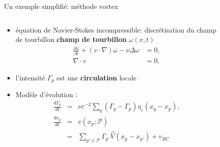\documentclass[aspectratio=169]{beamer} %
\begin{document}
\begin{frame}{Un exemple simplifié: méthode vortex~\footnotemark[1]}
    \small
    \vspace{-0.5cm}
    \begin{columns}[t]
        \begin{column}{0.5\textwidth}
            \begin{itemize}
                \item équation de Navier-Stokes incompressible: discrétisation du champ de tourbillon \textbf{champ de tourbillon} $\omega(x, t)$ \\
                      \begin{eqnarray*}
                          \frac{\partial \omega}{\partial t} + (v \cdot \nabla)   \omega - \nu \Delta  \omega & = 0, \\
                          \nabla \cdot  v                                                                                & = 0,
                      \end{eqnarray*}
                \item l'intensité $\Gamma_p$ est une \textbf{circulation} locale
                \item Modèle d'évolution : \\
                      \begin{eqnarray*}
                          \frac{d\Gamma_p}{dt} &=& \nu \varepsilon^{-2} \sum_q (\Gamma_q - \Gamma_p) \eta_\varepsilon(x_q - x_p), \\
                          \frac{d x_p}{d t} &=& v(x_p; \mathcal P) \\
                          &=& \sum_{p' \in \mathcal P} \Gamma_{p'} \vec{V}(x_p - x_{p'}) + v_{BC} \\
                      \end{eqnarray*}
            \end{itemize}
        \end{column}
        \begin{column}{0.5\textwidth}
            \begin{figure}

\end{figure}
\end{column}
\end{columns}
\end{frame}
\end{document}
